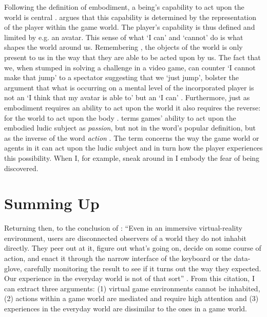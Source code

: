 Following the definition of embodiment, a being's capability to act upon the world is central \cite{ponty}.  argues that this capability is determined by the representation of the player within the game world. The player's capability is thus defined and limited by e.g. an avatar. This sense of what `I can' and `cannot' do is what shapes the world around us. Remembering , the objects of the world is only present to us in the way that they are able to be acted upon by us. The fact that we, when stumped in solving a challenge in a video game, can counter `I cannot make that jump' to a spectator suggesting that we `just jump', bolster the argument that what is occurring on a mental level of the incorporated player is not an `I think that my avatar is able to' but an `I can' \cite{vellashort}. Furthermore, just as embodiment requires an ability to act upon the world it also requires the reverse: for the world to act upon the body \cite{ponty}.  terms games' ability to act upon the embodied ludic subject as \textit{passion}, but not in the word's popular definition, but as the inverse of the word \textit{action} \cite{vella}. The term concerns the way the game world or agents in it can act upon the ludic subject and in turn how the player experiences this possibility. When I, for example, sneak around in  I embody the fear of being discovered.

\section*{Summing Up}
Returning then, to the conclusion of : ``Even in an immersive virtual-reality environment, users are disconnected observers of a world they do not inhabit directly. They peer out at it, figure out what’s going on, decide on some course of action, and enact it through the narrow interface of the keyboard or the data-glove, carefully monitoring the result to see if it turns out the way they expected. Our experience in the everyday world is not of that sort'' \cite[p. 102]{dourish}. From this citation, I can extract three arguments: (1) virtual game environments cannot be inhabited, (2) actions within a game world are mediated and require high attention and (3) experiences in the everyday world are dissimilar to the ones in a game world.

